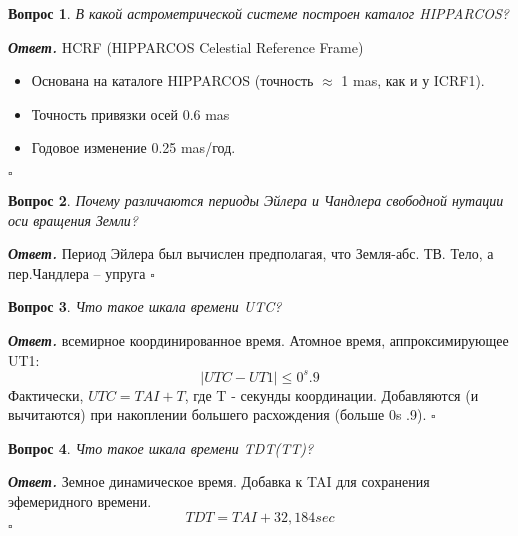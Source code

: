 \documentclass[12pt]{article}
\newtheorem{problem}{Вопрос}
\newenvironment{solution}[1][\it{Ответ}]{\textbf{#1. } }{$\square$}
\begin{document}
		\begin{problem}
			В какой астрометрической
			системе построен каталог
			HIPPARCOS? 
		\end{problem}
		
		\begin{solution}
			HCRF (HIPPARCOS Celestial Reference Frame)
			\begin{itemize}
			\item Основана на каталоге HIPPARCOS (точность $\approx$ 1 mas, как и у ICRF1).
			\item Точность привязки осей 0.6 mas
			\item Годовое изменение 0.25 mas/год.
			\end{itemize}		
		\end{solution}
		
		\begin{problem}
			Почему различаются
			периоды Эйлера и Чандлера
			свободной нутации оси
			вращения Земли?
		\end{problem}
		
		\begin{solution}
			Период
			Эйлера был вычислен
			предполагая, что Земля-абс. ТВ.
			Тело, а пер.Чандлера – упруга	
		\end{solution}
		
		\begin{problem}
			Что такое шкала времени
			UTC?
		\end{problem}
		
		\begin{solution}
			всемирное координированное время. Атомное время, аппроксимирующее UT1: $$|UTC - UT1| \le 0^s .9 $$
			Фактически, $UTC = TAI + T$, где T - секунды координации. Добавляются (и вычитаются) при накоплении
			большего расхождения (больше 0s .9).		
		\end{solution}
		
		\begin{problem}
			Что такое шкала времени
			TDT(TT)?
		\end{problem}
		
		\begin{solution}
		Земное динамическое время. Добавка к TAI для сохранения эфемеридного времени.
		$$TDT=TAI+32,184 sec$$	
		\end{solution}
		
		
\end{document}
